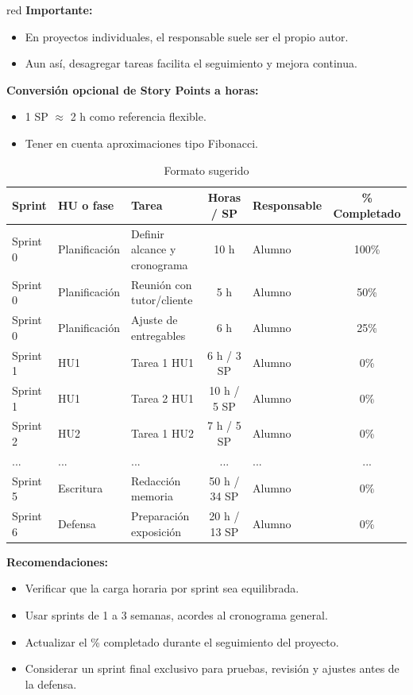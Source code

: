 \documentclass[
11pt, %
]{charter}
\begin{document}
\begin{consigna}{red}
\textbf{Importante:}
\begin{itemize}
  \item En proyectos individuales, el responsable suele ser el propio autor.
  \item Aun así, desagregar tareas facilita el seguimiento y mejora continua.
\end{itemize}

\textbf{Conversión opcional de Story Points a horas:}
\begin{itemize}
  \item 1 SP \(\approx\) 2 h como referencia flexible.
  \item Tener en cuenta aproximaciones tipo Fibonacci.
\end{itemize}

\begin{table}[htpb]
\centering
\caption{Formato sugerido}
\begin{tabularx}{\linewidth}{@{}|l|l|X|c|l|c|@{}}
\hline
\rowcolor[HTML]{C0C0C0}
Sprint & HU o fase & Tarea & Horas / SP & Responsable & \% Completado \\ \hline
Sprint 0 & Planificación & Definir alcance y cronograma & 10 h & Alumno & 100\% \\ \hline
Sprint 0 & Planificación & Reunión con tutor/cliente & 5 h & Alumno & 50\% \\ \hline
Sprint 0 & Planificación & Ajuste de entregables & 6 h & Alumno & 25\% \\ \hline
Sprint 1 & HU1 & Tarea 1 HU1 & 6 h / 3 SP & Alumno & 0\% \\ \hline
Sprint 1 & HU1 & Tarea 2 HU1 & 10 h / 5 SP & Alumno & 0\% \\ \hline
Sprint 2 & HU2 & Tarea 1 HU2 & 7 h / 5 SP & Alumno & 0\% \\ \hline
... & ... & ... & ... & ... & ... \\ \hline
Sprint 5 & Escritura & Redacción memoria & 50 h / 34 SP & Alumno & 0\% \\ \hline
Sprint 6 & Defensa & Preparación exposición & 20 h / 13 SP & Alumno & 0\% \\ \hline
\end{tabularx}
\end{table}

\textbf{Recomendaciones:}
\begin{itemize}
  \item Verificar que la carga horaria por sprint sea equilibrada.
  \item Usar sprints de 1 a 3 semanas, acordes al cronograma general.
  \item Actualizar el \% completado durante el seguimiento del proyecto.
  \item Considerar un sprint final exclusivo para pruebas, revisión y ajustes antes de la defensa.
\end{itemize}

\end{consigna} %
\end{document}
